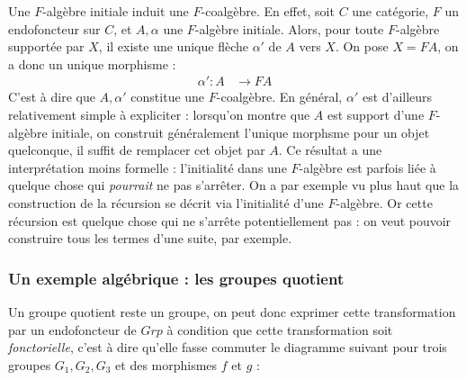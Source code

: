\documentclass{article}
\begin{document}
Une $F$-algèbre initiale induit une $F$-coalgèbre. En effet, soit $C$ une catégorie, $F$ un endofoncteur sur $C$, et $A, \alpha$ une $F$-algèbre initiale. Alors, pour toute $F$-algèbre supportée par $X$, il existe une unique flèche $ \alpha'$ de $A$ vers $X$. On pose $X = FA$, on a donc un unique morphisme : 
\begin{align*}
    \alpha' : A & \rightarrow FA 
\end{align*}
C'est à dire que $A, \alpha'$ constitue une $F$-coalgèbre. En général, $\alpha'$ est d'ailleurs relativement simple à expliciter : lorsqu'on montre que $A$ est support d'une $F$-algèbre initiale, on construit généralement l'unique morphsme pour un objet quelconque, il suffit de remplacer cet objet par $A$.
Ce résultat a une interprétation moins formelle : l'initialité dans une $F$-algèbre est parfois liée à quelque chose qui \textit{pourrait} ne pas s'arrêter. On a par exemple vu plus haut que la construction de la récursion se décrit via l'initialité d'une $F$-algèbre. Or cette récursion est quelque chose qui ne s'arrête potentiellement pas : on veut pouvoir construire tous les termes d'une suite, par exemple. 

\subsubsection{Un exemple algébrique : les groupes quotient}

Un groupe quotient reste un groupe, on peut donc exprimer cette transformation par un endofoncteur de $Grp$ à condition que cette transformation soit \textit{fonctorielle}, c'est à dire qu'elle fasse commuter le diagramme suivant pour trois groupes $G_1,G_2,G_3$ et des morphismes $f$ et $g$ : 

\begin{center}
\end{center}
\end{document}

